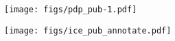 \documentclass[12pt]{article}
\begin{document}
\begin{figure}[h!]
  \centering
    \texttt{[image: figs/pdp\_pub-1.pdf]}  
  \caption{
  }
  \label{fig:pdp}
\end{figure}

\clearpage

\begin{figure}[h!]
  \centering
    
    \texttt{[image: figs/ice\_pub\_annotate.pdf]}  

  \caption{
  }
    \label{fig:ice}

\end{figure}
\end{document}
